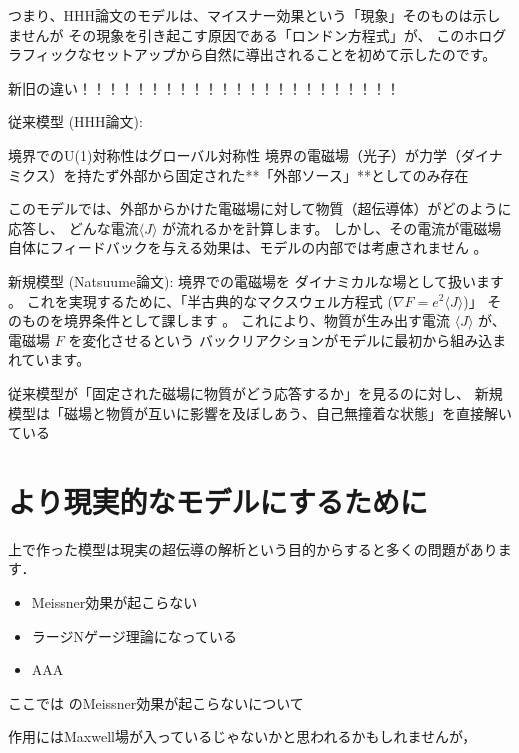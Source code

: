 \documentclass[b5paper,11pt,dvipdfmx]{jsarticle}
\numberwithin{equation}{section}
\theoremstyle{definition}
\begin{document}
つまり、HHH論文のモデルは、マイスナー効果という「現象」そのものは示しませんが
その現象を引き起こす原因である「ロンドン方程式」が、
このホログラフィックなセットアップから自然に導出されることを初めて示したのです。










新旧の違い！！！！！！！！！！！！！！！！！！！！！！！

従来模型 (HHH論文):

境界でのU(1)対称性はグローバル対称性
境界の電磁場（光子）が力学（ダイナミクス）を持たず外部から固定された**「外部ソース」**としてのみ存在

このモデルでは、外部からかけた電磁場に対して物質（超伝導体）がどのように応答し、
どんな電流$\langle J \rangle$ が流れるかを計算します。
しかし、その電流が電磁場自体にフィードバックを与える効果は、モデルの内部では考慮されません 。

新規模型 (Natsuume論文):
境界での電磁場を
ダイナミカルな場として扱います 。
これを実現するために、「半古典的なマクスウェル方程式 ($\nabla F = e^2 \langle J \rangle$)」
そのものを境界条件として課します 。
これにより、物質が生み出す電流 $\langle J \rangle$ が、電磁場 $F$ を変化させるという
バックリアクションがモデルに最初から組み込まれています。

従来模型が「固定された磁場に物質がどう応答するか」を見るのに対し、
新規模型は「磁場と物質が互いに影響を及ぼしあう、自己無撞着な状態」を直接解いている













\section{より現実的なモデルにするために}

上で作った模型は現実の超伝導の解析という目的からすると多くの問題があります．
\begin{itemize}
    \item Meissner効果が起こらない
    \item ラージNゲージ理論になっている
    \item AAA
\end{itemize}
ここでは
のMeissner効果が起こらないについて

作用にはMaxwell場が入っているじゃないかと思われるかもしれませんが，
\end{document}
